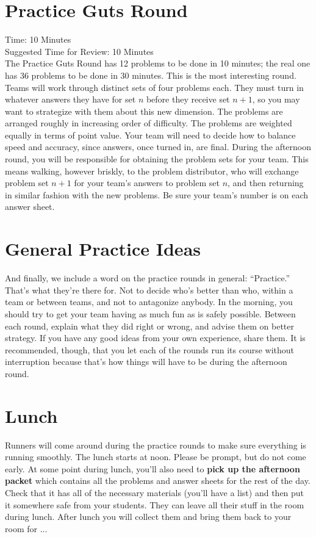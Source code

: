 \documentclass[11pt]{article}
\begin{document}
\begin{small}
\section{Practice Guts Round}
\noindent Time: 10 Minutes \\
\noindent Suggested Time for Review: 10 Minutes\\
\noindent The Practice Guts Round has 12 problems to be done in 10 minutes; the real one has 36 problems to be done in 30 minutes.  This is the most interesting round. Teams will work through distinct sets of four problems each. They must turn in whatever answers they have for set $n$ before they receive set $n+1$, so you may want to strategize with them about this new dimension. The problems are arranged roughly in increasing order of difficulty. The problems are weighted equally in terms of point value. Your team will need to decide how to balance speed and accuracy, since answers, once turned in, are final.  During the afternoon round, you will be responsible for obtaining the problem sets for your team. This means walking, however briskly, to the problem distributor, who will exchange problem set $n + 1$ for your team's answers to problem set $n$, and then returning in similar fashion with the new problems. Be sure your team's number is on each answer sheet.

\section{General Practice Ideas}
\noindent And finally, we include a word on the practice rounds in general: ``Practice.'' That's what they're there for. Not to decide who's better than who, within a team or between teams, and not to antagonize anybody. In the morning, you should try to get your team having as much fun as is safely possible. Between each round, explain what they did right or wrong, and advise them on better strategy. If you have any good ideas from your own experience, share them. It is recommended, though, that you let each of the rounds run its course without interruption because that's how things will have to be during the afternoon round.

\section{Lunch}
\noindent Runners will come around during the practice rounds to make sure everything is running smoothly. The lunch starts at noon. Please be prompt, but do not come early. At some point during lunch, you'll also need to \textbf{pick up the afternoon packet} which contains all the problems and answer sheets for the rest of the day. Check that it has all of the necessary materials (you'll have a list) and then put it somewhere safe from your students. They can leave all their stuff in the room during lunch. After lunch you will collect them and bring them back to your room for ...


\end{small}
\end{document}
